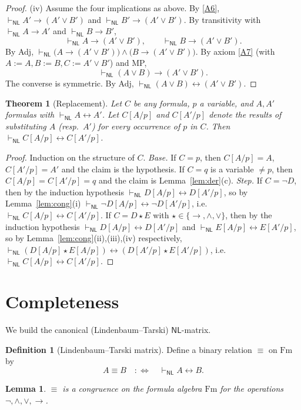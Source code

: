 \documentclass[12pt]{article}
\newtheorem{theorem}{Theorem}
\newtheorem{lemma}{Lemma}
\theoremstyle{definition}
\newtheorem{definition}{Definition}
\newcommand{\NL}{\mathsf{NL}}
\newcommand{\prv}{\vdash_{\NL}}
\newcommand{\Fm}{\mathrm{Fm}}
\newcommand{\imp}{\rightarrow}
\newcommand{\bic}{\leftrightarrow}
\begin{document}
\begin{proof}
\smallskip
\noindent(iv) Assume the four implications as above. By \eqref{A6},
$\prv A'\imp(A'\vee B')$ and $\prv B'\imp(A'\vee B')$. By transitivity with
$\prv A\imp A'$ and $\prv B\imp B'$,
\[
\prv A\imp(A'\vee B'), \qquad \prv B\imp(A'\vee B').
\]
By Adj, $\prv \big(A\imp(A'\vee B')\big)\wedge\big(B\imp(A'\vee B')\big)$.
By axiom \eqref{A7} (with $A:=A,B:=B,C:=A'\vee B'$) and MP,
\[
\prv (A\vee B)\imp(A'\vee B').
\]
The converse is symmetric. By Adj, $\prv (A\vee B)\bic(A'\vee B')$.
\end{proof}

\begin{theorem}[Replacement]\label{thm:repl}
Let $C$ be any formula, $p$ a variable, and $A,A'$ formulas with
$\prv A\bic A'$. Let $C[A/p]$ and $C[A'/p]$ denote the results of substituting
$A$ (resp.\ $A'$) for every occurrence of $p$ in $C$. Then
$\prv C[A/p]\bic C[A'/p]$.
\end{theorem}

\begin{proof}
Induction on the structure of $C$.
\emph{Base.} If $C=p$, then $C[A/p]=A$, $C[A'/p]=A'$ and the claim is the
hypothesis. If $C=q$ is a variable $\neq p$, then $C[A/p]=C[A'/p]=q$ and the
claim is Lemma~\ref{lem:der}(c).
\emph{Step.} If $C=\neg D$, then by the induction hypothesis
$\prv D[A/p]\bic D[A'/p]$, so by Lemma~\ref{lem:cong}(i)
$\prv\neg D[A/p]\bic\neg D[A'/p]$, i.e.\ $\prv C[A/p]\bic C[A'/p]$.
If $C=D\star E$ with $\star\in\{\imp,\wedge,\vee\}$, then by the induction
hypothesis $\prv D[A/p]\bic D[A'/p]$ and $\prv E[A/p]\bic E[A'/p]$, so by
Lemma~\ref{lem:cong}(ii),(iii),(iv) respectively,
$\prv (D[A/p]\star E[A/p])\bic(D[A'/p]\star E[A'/p])$, i.e.\
$\prv C[A/p]\bic C[A'/p]$.
\end{proof}

\section{Completeness}

We build the canonical (Lindenbaum--Tarski) $\NL$-matrix.

\begin{definition}[Lindenbaum--Tarski matrix]\label{def:LT}
Define a binary relation $\equiv$ on $\Fm$ by
\[
A\equiv B \quad:\Longleftrightarrow\quad \prv A\bic B .
\]
\end{definition}

\begin{lemma}\label{lem:congrel}
$\equiv$ is a congruence on the formula algebra $\Fm$ for the operations
$\neg,\wedge,\vee,\imp$.
\end{lemma}
\end{document}
